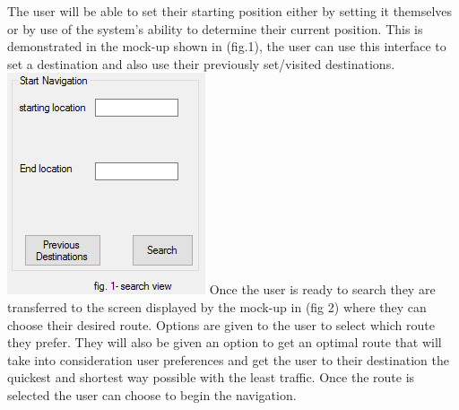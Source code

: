 \documentclass[a4paper,12pt]{article}
\begin{document}
The user will be able to set their starting position either by setting it themselves or by use of the system's ability to determine their current position. This is demonstrated in the mock-up shown in (fig.1), the user can use this interface to set a destination and also use their previously set/visited destinations. 
\includegraphics[width=\textwidth]{images/user_one.PNG}
Once the user is ready to search they are transferred to the screen displayed by the mock-up in (fig 2) where they can choose their desired route. Options are given to the user to select which route they prefer. They will also be given an option to get an optimal route that will  take into consideration user preferences and get the user to their destination the quickest and shortest way possible with the least traffic. Once the route is selected the user can choose to begin the navigation.
\end{document}

